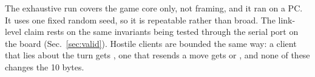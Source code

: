 The exhaustive run covers the game core only, not framing, and it ran on a PC. It uses one fixed random seed, so it is repeatable
rather than broad. The link-level claim rests on the same invariants being tested through the serial port on the board
(Sec.~\ref{sec:valid}). Hostile clients are bounded the same way: a client that lies about the turn gets , one that
resends a move gets  or , and none of these changes the 10 bytes.
